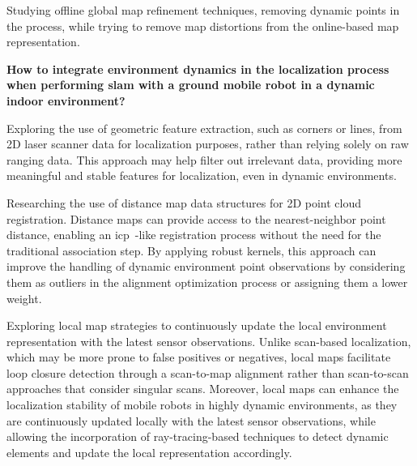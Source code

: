 \begin{hypothesis}\label{hypothesis:mapping:ogba}
Studying offline global map refinement techniques, removing dynamic points in
the process, while trying to remove map distortions from the online-based
map representation.
\end{hypothesis}

\begin{question}\label{question:localization}
\textbf{How to integrate environment dynamics in the localization process
when performing \gls{slam} with a ground mobile robot
in a dynamic indoor environment?}
\end{question}


\begin{hypothesis}\label{hypothesis:localization:features}
Exploring the use of geometric feature extraction, such as corners or lines,
from 2D laser scanner data for localization purposes,
rather than relying solely on raw ranging data.
This approach may help filter out irrelevant data, providing more meaningful and
stable features for localization, even in dynamic environments.
\end{hypothesis}

\begin{hypothesis}\label{hypothesis:localization:distance-maps}
Researching the use of distance map data structures for
2D point cloud registration. Distance maps can provide access to the
nearest-neighbor point distance, enabling an
\gls{icp}~\cite{besl-mckay:tpami:year}-like registration process without the
need for the traditional association step. By applying robust kernels,
this approach can improve the handling of dynamic environment point observations
by considering them as outliers in the alignment optimization process
or assigning them a lower weight.
\end{hypothesis}

\begin{hypothesis}\label{hypothesis:localization:local-maps}
Exploring local map strategies to continuously update the local environment
representation with the latest sensor observations. Unlike scan-based
localization, which may be more prone to false positives or negatives,
local maps facilitate loop closure detection through a scan-to-map alignment
rather than scan-to-scan approaches that consider singular scans.
Moreover, local maps can enhance the localization stability of mobile robots in
highly dynamic environments, as they are continuously updated locally with the
latest sensor observations, while allowing the incorporation of
ray-tracing-based techniques to detect dynamic elements and update the local
representation accordingly.
\end{hypothesis}

